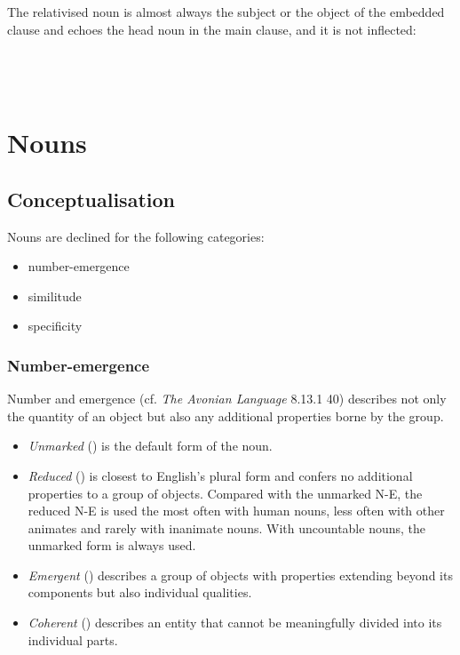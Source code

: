 \documentclass{book}
\begin{document}
The relativised noun is almost always the subject or the object of the embedded clause and echoes the head noun in the main clause, and it is not inflected: \\
~\\
        \\
        \\
     

\chapter{Nouns}

\section{Conceptualisation}

Nouns are declined for the following categories:

\begin{itemize}
  \item number-emergence
  \item similitude
  \item specificity
\end{itemize}

\subsection{Number-emergence}

Number and emergence (cf. \emph{The Avonian Language} 8.13.1 40) describes not only the quantity of an object but also any additional properties borne by the group.

\begin{itemize}
  \item \emph{Unmarked} () is the default form of the noun.
  \item \emph{Reduced} () is closest to English's plural form and confers no additional properties to a group of objects. Compared with the unmarked N-E, the reduced N-E is used the most often with human nouns, less often with other animates and rarely with inanimate nouns. With uncountable nouns, the unmarked form is always used.
  \item \emph{Emergent} () describes a group of objects with properties extending beyond its components but also individual qualities.
  \item \emph{Coherent} () describes an entity that cannot be meaningfully divided into its individual parts.
\end{itemize}
\end{document}
